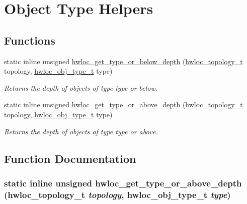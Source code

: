 \hypertarget{group__hwlocality__helper__types}{
\section{Object Type Helpers}
\label{group__hwlocality__helper__types}
}
\subsection*{Functions}
\begin{DoxyCompactItemize}
\item 
static inline unsigned \hyperlink{group__hwlocality__helper__types_gaa0835c86ef2ce8c62637d61a1cf134f9}{hwloc\_\-get\_\-type\_\-or\_\-below\_\-depth} (\hyperlink{group__hwlocality__topology_ga9d1e76ee15a7dee158b786c30b6a6e38}{hwloc\_\-topology\_\-t} topology, \hyperlink{group__hwlocality__types_gacd37bb612667dc437d66bfb175a8dc55}{hwloc\_\-obj\_\-type\_\-t} type)
\begin{DoxyCompactList}\small\item\em Returns the depth of objects of type {\ttfamily type} or below. \item\end{DoxyCompactList}\item 
static inline unsigned \hyperlink{group__hwlocality__helper__types_ga65a1d8f1012cb500817893ef848bc3f1}{hwloc\_\-get\_\-type\_\-or\_\-above\_\-depth} (\hyperlink{group__hwlocality__topology_ga9d1e76ee15a7dee158b786c30b6a6e38}{hwloc\_\-topology\_\-t} topology, \hyperlink{group__hwlocality__types_gacd37bb612667dc437d66bfb175a8dc55}{hwloc\_\-obj\_\-type\_\-t} type)
\begin{DoxyCompactList}\small\item\em Returns the depth of objects of type {\ttfamily type} or above. \item\end{DoxyCompactList}\end{DoxyCompactItemize}


\subsection{Function Documentation}
\hypertarget{group__hwlocality__helper__types_ga65a1d8f1012cb500817893ef848bc3f1}{
\subsubsection[{hwloc\_\-get\_\-type\_\-or\_\-above\_\-depth}]{\setlength{\rightskip}{0pt plus 5cm}static inline unsigned hwloc\_\-get\_\-type\_\-or\_\-above\_\-depth ({\bf hwloc\_\-topology\_\-t} {\em topology}, \/  {\bf hwloc\_\-obj\_\-type\_\-t} {\em type})}}
\label{group__hwlocality__helper__types_ga65a1d8f1012cb500817893ef848bc3f1}


